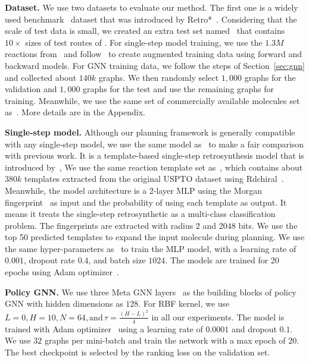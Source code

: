 \documentclass[sigconf]{acmart}
\begin{document}
\textbf{Dataset.}
We use two datasets to evaluate our method. The first one is a widely used benchmark \uspto~dataset that was introduced by Retro*~\citep{Chen2020}.
Considering that the scale of test data is small, we created an extra test set named \usptoext~that contains $10 \times$ sizes of test routes of \uspto.
For single-step model training, we use the $1.3M$ reactions from~\citet{Chen2020} and follow~\citep{Kim2021} to create augmented training data using forward and backward models.
For GNN training data, we follow the steps of Section~\ref{sec:gnn} and collected about $140k$ graphs.
We then randomly select $1,000$ graphs for the validation and $1,000$ graphs for the test and use the remaining graphs for training.
Meanwhile, we use the same set of commercially available molecules set as~\cite{Chen2020,Kim2021}.
More details are in the Appendix.

\noindent\textbf{Single-step model.}
Although our planning framework is generally compatible with any single-step model,
we use the same model as~\citet{Chen2020, Kim2021} to make a fair comparison with previous work.
It is a template-based single-step retrosynthesis model that is introduced by~\citet{segler2017towards},
We use the same reaction template set as~\citet{Chen2020}, which contains about $380k$ templates extracted from the original USPTO dataset using Rdchiral~\citep{coley2019rdchiral}.
Meanwhile, the model architecture is a 2-layer MLP using the Morgan fingerprint~\citep{rogers2010extended} as input and the probability of using each template as output.
It means it treats the single-step retrosynthetic as a multi-class classification problem.
The fingerprints are extracted with radius $2$ and $2048$ bits.
We use the top 50 predicted templates to expand the input molecule during planning.
We use the same hyper-parameters as~\citet{Kim2021} to train the MLP model, with a learning rate of $0.001$, dropout rate $0.4$, and batch size $1024$.
The models are trained for 20 epochs using Adam optimizer~\citep{kingma2014adam}.

\noindent\textbf{Policy GNN.}
We use three Meta GNN layers~\cite{battaglia2018relational} as the building blocks of policy GNN with hidden dimensions as $128$.
For RBF kernel, we use $L=0, H=10, N=64, \text{and}\, \tau=\frac{(H-L)^2}{4}$ in all our experiments.
The model is trained with Adam optimizer~\citep{kingma2014adam} using a learning rate of $0.0001$ and dropout $0.1$.
We use $32$ graphs per mini-batch and train the network with a max epoch of $20$.
The best checkpoint is selected by the ranking loss on the validation set.
\end{document}
